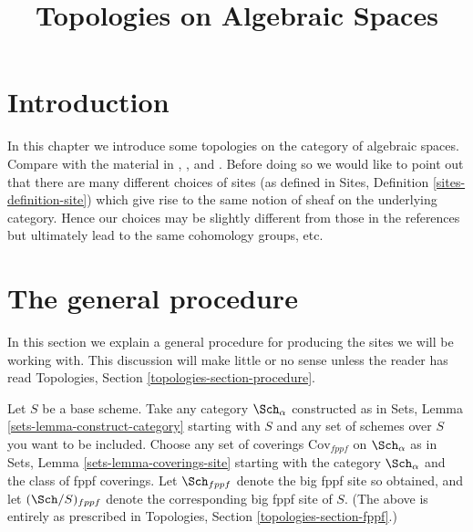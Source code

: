 

%


\title{Topologies on Algebraic Spaces}

\maketitle

\label{section-phantom}

\tableofcontents




\section{Introduction}
\label{section-introduction}

\noindent
In this chapter we introduce some topologies on the
category of algebraic spaces. Compare with the material in \cite{SGA1},
\cite{Ner}, \cite{LM-B} and \cite{Kn}.
Before doing so we would like to point out that there
are many different choices of sites (as defined in
Sites, Definition \ref{sites-definition-site}) which give rise to
the same notion of sheaf on the underlying category. Hence
our choices may be slightly different from those in the references
but ultimately lead to the same cohomology groups, etc.




\section{The general procedure}
\label{section-procedure}

\noindent
In this section we explain a general procedure for producing the
sites we will be working with. This discussion will make little or
no sense unless the reader has read
Topologies, Section \ref{topologies-section-procedure}.

\medskip\noindent
Let $S$ be a base scheme.
Take any category $\Sch_\alpha$ constructed as in
Sets, Lemma \ref{sets-lemma-construct-category} starting with
$S$ and any set of schemes over $S$ you want to be included.
Choose any set of
coverings $\text{Cov}_{fppf}$ on $\Sch_\alpha$ as in
Sets, Lemma \ref{sets-lemma-coverings-site}
starting with the category $\Sch_\alpha$ and the class of fppf
coverings. Let $\Sch_{fppf}$ denote the big fppf site so
obtained, and let $(\Sch/S)_{fppf}$ denote the corresponding
big fppf site of $S$. (The above is entirely as prescribed in Topologies,
Section \ref{topologies-section-fppf}.)

